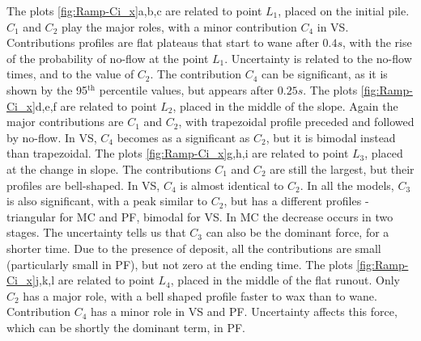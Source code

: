 \documentclass{article}
\begin{document}
The plots \ref{fig:Ramp-Ci_x}a,b,c are related to point $L_1$, placed on the initial pile. $C_1$ and $C_2$ play the major roles, with a minor contribution $C_4$ in VS. Contributions profiles are flat plateaus that start to wane after $0.4 s$, with the rise of the probability of no-flow at the point $L_1$. Uncertainty is related to the no-flow times, and to the value of $C_2$. The contribution $C_4$ can be significant, as it is shown by the 95$^{\mathrm{th}}$ percentile values, but appears after $0.25 s$. The plots \ref{fig:Ramp-Ci_x}d,e,f are related to point $L_2$, placed in the middle of the slope. Again the major contributions are $C_1$ and $C_2$, with trapezoidal profile preceded and followed by no-flow. In VS, $C_4$ becomes as a significant as $C_2$, but it is bimodal instead than trapezoidal. The plots \ref{fig:Ramp-Ci_x}g,h,i are related to point $L_3$, placed at the change in slope. The contributions $C_1$ and $C_2$ are still the largest, but their profiles are bell-shaped. In VS, $C_4$ is almost identical to $C_2$. In all the models, $C_3$ is also significant, with a peak similar to $C_2$, but has a different profiles - triangular for MC and PF, bimodal for VS. In MC the decrease occurs in two stages. The uncertainty tells us that $C_3$ can also be the dominant force, for a shorter time. Due to the presence of deposit, all the contributions are small (particularly small in PF), but not zero at the ending time. The plots \ref{fig:Ramp-Ci_x}j,k,l are related to point $L_4$, placed in the middle of the flat runout. Only $C_2$ has a major role, with a bell shaped profile faster to wax than to wane. Contribution $C_4$ has a minor role in VS and PF. Uncertainty affects this force, which can be shortly the dominant term, in PF.
\end{document}
